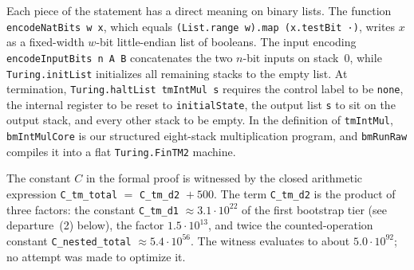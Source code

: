 Each piece of the statement has a direct meaning on binary lists. The function \texttt{encodeNatBits w x}, which equals \texttt{(List.range w).map (x.testBit ·)}, writes $x$ as a fixed-width $w$-bit little-endian list of booleans. The input encoding \texttt{encodeInputBits n A B} concatenates the two $n$-bit inputs on stack~$0$, while \texttt{Turing.initList} initializes all remaining stacks to the empty list. At termination, \texttt{Turing.haltList\allowbreak\ tmIntMul s} requires the control label to be \texttt{none}, the internal register to be reset to \texttt{initialState}, the output list \texttt{s} to sit on the output stack, and every other stack to be empty. In the definition of \texttt{tmIntMul}, \texttt{bmIntMulCore} is our structured eight-stack multiplication program, and \texttt{bmRunRaw} compiles it into a flat \texttt{Turing.FinTM2} machine.

The constant $C$ in the formal proof is witnessed by the closed arithmetic expression \texttt{C\_\allowbreak tm\_\allowbreak total} $=$ \texttt{C\_\allowbreak tm\_\allowbreak d2} ${}+ 500$. The term \texttt{C\_\allowbreak tm\_\allowbreak d2} is the product of three factors: the constant \texttt{C\_\allowbreak tm\_\allowbreak d1} $\approx 3.1\cdot 10^{22}$ of the first bootstrap tier (see departure~(2) below), the factor $1.5\cdot 10^{13}$, and twice the counted-operation constant \texttt{C\_\allowbreak nested\_\allowbreak total} $\approx 5.4\cdot 10^{56}$. The witness evaluates to about $5.0\cdot 10^{92}$; no attempt was made to optimize it.

